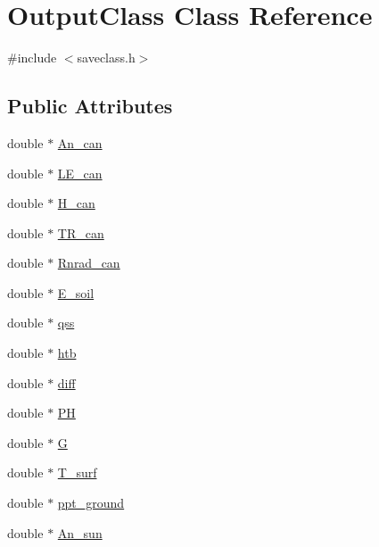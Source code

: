 \hypertarget{class_output_class}{}\section{Output\+Class Class Reference}
\label{class_output_class}


{\ttfamily \#include $<$saveclass.\+h$>$}

\subsection*{Public Attributes}
\begin{DoxyCompactItemize}
\item 
double $\ast$ \hyperlink{class_output_class_af8ac8135102338d694c0744196727537}{An\+\_\+can}
\item 
double $\ast$ \hyperlink{class_output_class_a91bb0de14776184bce9b18ae46672952}{L\+E\+\_\+can}
\item 
double $\ast$ \hyperlink{class_output_class_afdc407927b6e08f837e30607da331a15}{H\+\_\+can}
\item 
double $\ast$ \hyperlink{class_output_class_aac034a2d32ea29cc88088a35435453f8}{T\+R\+\_\+can}
\item 
double $\ast$ \hyperlink{class_output_class_aebf2f2460fd9b2459b5ab75c4b82b504}{Rnrad\+\_\+can}
\item 
double $\ast$ \hyperlink{class_output_class_a919c73b7af41e967aa55caf161ded574}{E\+\_\+soil}
\item 
double $\ast$ \hyperlink{class_output_class_a5bfcf99d5aa9fdbeab5f216e27504ec5}{qss}
\item 
double $\ast$ \hyperlink{class_output_class_aa5de7c0e29de7fb6daf503b09846d5e2}{htb}
\item 
double $\ast$ \hyperlink{class_output_class_acece166fe7e07f209e846e45c0666122}{diff}
\item 
double $\ast$ \hyperlink{class_output_class_a9596c6d128ae8702cc253bba14f08672}{PH}
\item 
double $\ast$ \hyperlink{class_output_class_aa2a113d6851d160b0f06a3e21613a32d}{G}
\item 
double $\ast$ \hyperlink{class_output_class_ae36ec6a15ba2059b1626ebc542897ea4}{T\+\_\+surf}
\item 
double $\ast$ \hyperlink{class_output_class_a18530ed6f15b0bbbdf4e8e76bbc72ef7}{ppt\+\_\+ground}
\item 
double $\ast$ \hyperlink{class_output_class_aa555ec512f2e02091da1482d73af26b9}{An\+\_\+sun}
\item 

\end{DoxyCompactItemize}
